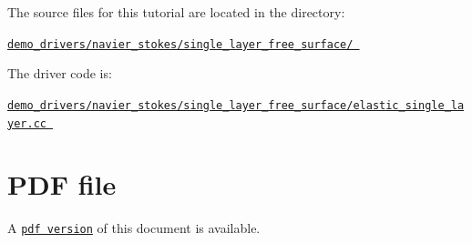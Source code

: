 \begin{DoxyItemize}
\item The source files for this tutorial are located in the directory\+: \begin{center} \href{../../../../demo_drivers/navier_stokes/single_layer_free_surface/}{\tt demo\+\_\+drivers/navier\+\_\+stokes/single\+\_\+layer\+\_\+free\+\_\+surface/ } \end{center} 
\item The driver code is\+: \begin{center} \href{../../../../demo_drivers/navier_stokes/single_layer_free_surface/elastic_single_layer.cc}{\tt demo\+\_\+drivers/navier\+\_\+stokes/single\+\_\+layer\+\_\+free\+\_\+surface/elastic\+\_\+single\+\_\+layer.\+cc } \end{center} 
\end{DoxyItemize}



 

 \hypertarget{index_pdf}{}\section{P\+D\+F file}\label{index_pdf}
A \href{../latex/refman.pdf}{\tt pdf version} of this document is available. 
